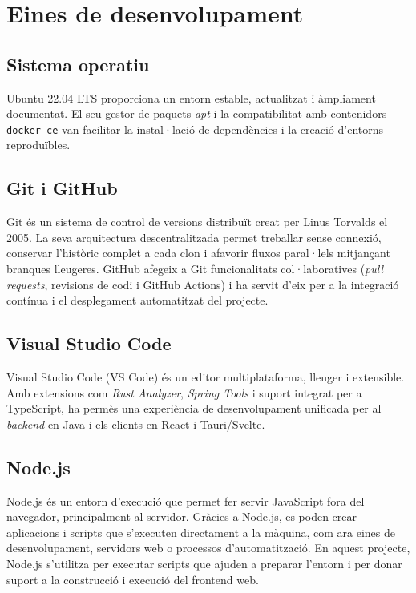 \section{Eines de desenvolupament}

\subsection*{Sistema operatiu}
Ubuntu 22.04 LTS proporciona un entorn estable, actualitzat i àmpliament documentat. El seu gestor de paquets \emph{apt} i la compatibilitat amb contenidors \texttt{docker-ce} van facilitar la instal·lació de dependències i la creació d'entorns reproduïbles.

\subsection*{Git i GitHub}
Git és un sistema de control de versions distribuït creat per Linus Torvalds el 2005. La seva arquitectura descentralitzada permet treballar sense connexió, conservar l'històric complet a cada clon i afavorir fluxos paral·lels mitjançant branques lleugeres. GitHub afegeix a Git funcionalitats col·laboratives (\emph{pull requests}, revisions de codi i GitHub Actions) i ha servit d'eix per a la integració contínua i el desplegament automatitzat del projecte.

\subsection*{Visual Studio Code}
Visual Studio Code (VS Code) és un editor multiplataforma, lleuger i extensible. Amb extensions com \emph{Rust Analyzer}, \emph{Spring Tools} i suport integrat per a TypeScript, ha permès una experiència de desenvolupament unificada per al \emph{backend} en Java i els clients en React i Tauri/Svelte.

\subsection*{Node.js}
Node.js és un entorn d'execució que permet fer servir JavaScript fora del navegador, principalment al servidor. Gràcies a Node.js, es poden crear aplicacions i scripts que s'executen directament a la màquina, com ara eines de desenvolupament, servidors web o processos d'automatització. En aquest projecte, Node.js s'utilitza per executar scripts que ajuden a preparar l'entorn i per donar suport a la construcció i execució del frontend web.

